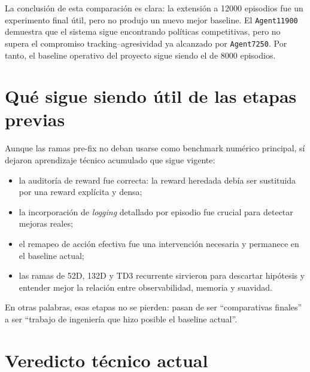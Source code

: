 \documentclass[11pt,a4paper]{article}
\begin{document}
La conclusi\'on de esta comparaci\'on es clara: la extensi\'on a 12000 episodios fue un experimento final \'util, pero no produjo un nuevo mejor baseline. El \texttt{Agent11900} demuestra que el sistema sigue encontrando pol\'iticas competitivas, pero no supera el compromiso tracking--agresividad ya alcanzado por \texttt{Agent7250}. Por tanto, el baseline operativo del proyecto sigue siendo el de 8000 episodios.

\section{Qu\'e sigue siendo \'util de las etapas previas}

Aunque las ramas pre-fix no deban usarse como benchmark num\'erico principal, s\'i dejaron aprendizaje t\'ecnico acumulado que sigue vigente:
\begin{itemize}[leftmargin=1.2cm]
    \item la auditor\'ia de reward fue correcta: la reward heredada deb\'ia ser sustituida por una reward expl\'icita y densa;
    \item la incorporaci\'on de \textit{logging} detallado por episodio fue crucial para detectar mejoras reales;
    \item el remapeo de acci\'on efectiva fue una intervenci\'on necesaria y permanece en el baseline actual;
    \item las ramas de 52D, 132D y TD3 recurrente sirvieron para descartar hip\'otesis y entender mejor la relaci\'on entre observabilidad, memoria y suavidad.
\end{itemize}

En otras palabras, esas etapas no se pierden: pasan de ser ``comparativas finales'' a ser ``trabajo de ingenier\'ia que hizo posible el baseline actual''.

\section{Veredicto t\'ecnico actual}
\end{document}
